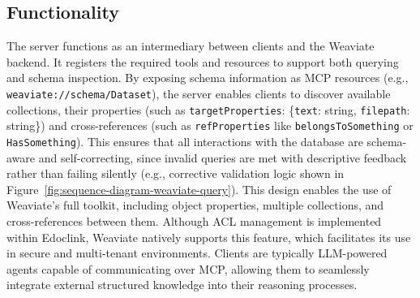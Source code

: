 \subsection{Functionality}
The server functions as an intermediary between clients and the Weaviate backend. It registers the required tools and resources to support both querying and schema inspection. By exposing schema information as MCP resources (e.g., \texttt{weaviate://schema/Dataset}), the server enables clients to discover available collections, their properties (such as \texttt{targetProperties}: \{\texttt{text}: string, \texttt{filepath}: string\}) and cross-references (such as \texttt{refProperties} like \texttt{belongsToSomething} or \texttt{HasSomething}). This ensures that all interactions with the database are schema-aware and self-correcting, since invalid queries are met with descriptive feedback rather than failing silently (e.g., corrective validation logic shown in Figure~\ref{fig:sequence-diagram-weaviate-query}).
This design enables the use of Weaviate’s full toolkit, including object properties, multiple collections, and cross-references between them. Although ACL management is implemented within Edoclink, Weaviate natively supports this feature, which facilitates its use in secure and multi-tenant environments. Clients are typically \gls{LLM}-powered agents capable of communicating over \gls{MCP}, allowing them to seamlessly integrate external structured knowledge into their reasoning processes.

